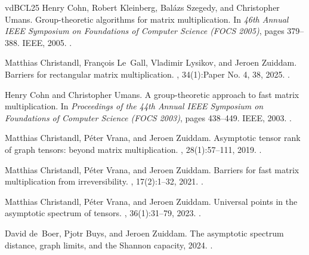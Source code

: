 \documentclass[11pt,letterpaper]{article}
\begin{document}
\begin{thebibliography}{vdBCL{\etalchar{+}}25}
Henry Cohn, Robert Kleinberg, Bal{\'a}zs Szegedy, and Christopher Umans.
\newblock Group-theoretic algorithms for matrix multiplication.
\newblock In {\em 46th Annual IEEE Symposium on Foundations of Computer Science
  (FOCS 2005)}, pages 379--388. IEEE, 2005.
\newblock \href {https://doi.org/10.1109/SFCS.2005.39}
  {}.

Matthias Christandl, Fran\c{c}ois Le~Gall, Vladimir Lysikov, and Jeroen
  Zuiddam.
\newblock Barriers for rectangular matrix multiplication.
, 34(1):Paper No. 4, 38, 2025.
\newblock \href {https://doi.org/10.1007/s00037-025-00264-9}
  {}.

Henry Cohn and Christopher Umans.
\newblock A group-theoretic approach to fast matrix multiplication.
\newblock In {\em Proceedings of the 44th Annual IEEE Symposium on Foundations
  of Computer Science ({FOCS} 2003)}, pages 438--449. IEEE, 2003.
\newblock \href {https://doi.org/10.1109/SFCS.2003.1238217}
  {}.

Matthias Christandl, P\'{e}ter Vrana, and Jeroen Zuiddam.
\newblock Asymptotic tensor rank of graph tensors: beyond matrix
  multiplication.
, 28(1):57--111, 2019.
\newblock \href {https://doi.org/10.1007/s00037-018-0172-8}
  {}.

Matthias Christandl, P\'eter Vrana, and Jeroen Zuiddam.
\newblock Barriers for fast matrix multiplication from irreversibility.
, 17(2):1--32, 2021.
\newblock \href {https://doi.org/10.4086/toc.2021.v017a002}
  {}.

Matthias Christandl, P\'{e}ter Vrana, and Jeroen Zuiddam.
\newblock Universal points in the asymptotic spectrum of tensors.
, 36(1):31--79, 2023.
\newblock \href {https://doi.org/10.1090/jams/996}
  {}.

David de~Boer, Pjotr Buys, and Jeroen Zuiddam.
\newblock The asymptotic spectrum distance, graph limits, and the {S}hannon
  capacity, 2024.
\newblock \href {https://arxiv.org/abs/2404.16763} {}.


\end{thebibliography}
\end{document}

